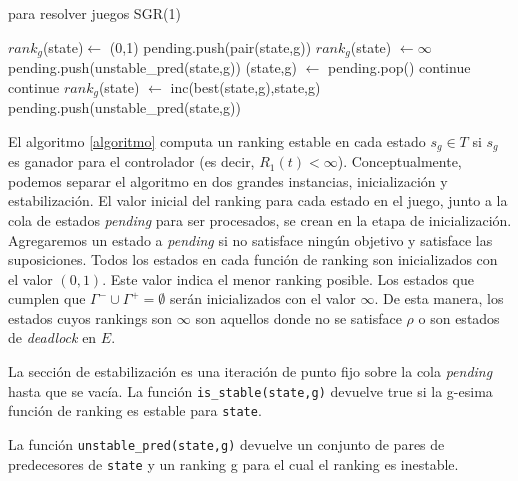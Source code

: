 \begin{algorithm}
\caption{para resolver juegos SGR(1)}\label{algoritmo}
\begin{algorithmic}[1]
        \State $rank_g$(state)$\gets$ (0,1)
    \EndFor
\EndFor
{}
        \State pending.push(pair(state,g))
    \EndIf
            \State $rank_g$(state) $\gets \infty$
            \State pending.push(unstable\_pred(state,g))
        \EndFor
    \EndIf
\EndFor
{}
    \State (state,g) $\gets$ pending.pop()
        \State continue
    \EndIf
        \State continue
    \EndIf
    \State $rank_g$(state) $\gets$ inc(best(state,g),state,g)
    \State pending.push(unstable\_pred(state,g))
\EndWhile
\EndProcedure
\end{algorithmic}
\end{algorithm}


El algoritmo \ref{algoritmo} computa un ranking estable en cada estado $s_g \in T$ si $s_g$ es ganador para el
controlador (es decir, $R_1(t)<\infty$). Conceptualmente, podemos separar el algoritmo en dos grandes instancias,
inicialización y estabilización. El valor inicial del ranking para cada estado en el juego, junto a la cola de
estados \emph{pending} para ser procesados, se crean en la etapa de inicialización. Agregaremos un estado a
\emph{pending} si no satisface ningún objetivo y satisface las suposiciones. Todos los estados en cada función de ranking
son inicializados con el valor $(0,1)$. Este valor indica el menor ranking posible. Los estados que cumplen que
$\Gamma^- \cup \Gamma^+ = \emptyset$ serán inicializados con el valor $\infty$. De esta manera, los estados cuyos
rankings son $\infty$ son aquellos donde no se satisface $\rho$ o son estados de \emph{deadlock} en $E$.

La sección de estabilización es una iteración de punto fijo sobre la cola \emph{pending} hasta que se vacía. La función
\texttt{is\_stable(state,g)} devuelve true si la g-esima función de ranking es estable para \texttt{state}.

La función \texttt{unstable\_pred(state,g)} devuelve un conjunto de pares de predecesores de \texttt{state} y un
ranking g para el cual el ranking es inestable.

